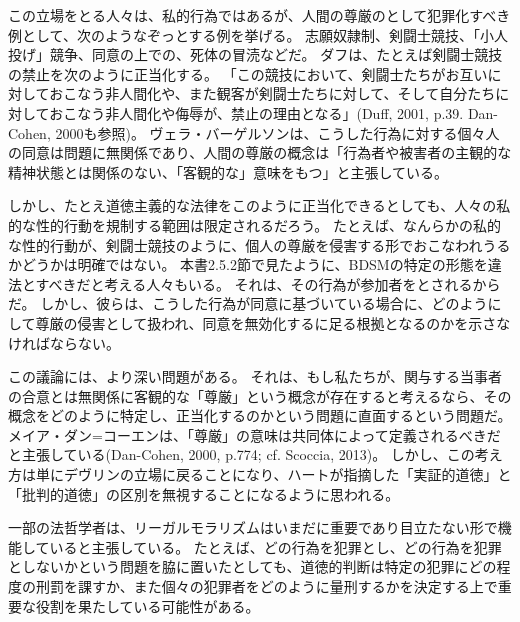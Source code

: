 \documentclass[paper=a4,book,openany]{jlreq}
\newcommand{\ig}[1]{}           %
\begin{document}
この立場をとる人々は、私的行為ではあるが、人間の尊厳のとして犯罪化すべき例として、次のようなぞっとする例を挙げる。
志願奴隷制、剣闘士競技、「小人投げ」競争、同意の上での、死体の冒涜などだ。
ダフは、たとえば剣闘士競技の禁止を次のように正当化する。
「この競技において、剣闘士たちがお互いに対しておこなう非人間化や、また観客が剣闘士たちに対して、そして自分たちに対しておこなう非人間化や侮辱が、禁止の理由となる」(Duff, 2001, p.39. Dan-Cohen, 2000も参照)。
ヴェラ・バーゲルソンは、こうした行為に対する個々人の同意は問題に無関係であり、人間の尊厳の概念は「行為者や被害者の主観的な精神状態とは関係のない、「客観的な」意味をもつ」と主張している\citep[p.217]{bergelson07:_right_be_hurt}。

しかし、たとえ道徳主義的な法律をこのように正当化できるとしても、人々の私的な性的行動を規制する範囲は限定されるだろう。
たとえば、なんらかの私的な性的行動が、剣闘士競技のように、個人の尊厳を侵害する形でおこなわれうるかどうかは明確ではない。
本書2.5.2節で見たように、BDSMの特定の形態を違法とすべきだと考える人々もいる。
それは、その行為が参加者をとされるからだ。
しかし、彼らは、こうした行為が同意に基づいている場合に、どのようにして尊厳の侵害として扱われ、同意を無効化するに足る根拠となるのかを示さなければならない。

この議論には、より深い問題がある。
それは、もし私たちが、関与する当事者の合意とは無関係に客観的な「尊厳」という概念が存在すると考えるなら、その概念をどのように特定し、正当化するのかという問題に直面するという問題だ。
メイア・ダン=コーエンは、「尊厳」の意味は共同体によって定義されるべきだと主張している(Dan-Cohen, 2000, p.774; cf. Scoccia, 2013)。
\nocite{scoccia13:_in_defen_pure_legal_moral}\nocite{dan-cohen00:_basic_values_victim_state_mind}
しかし、この考え方は単にデヴリン\ig{Patrick Devlin}の立場に戻ることになり、ハートが指摘した「実証的道徳」と「批判的道徳」の区別を無視することになるように思われる。

一部の法哲学者は、リーガルモラリズムはいまだに重要であり目立たない形で機能していると主張している。
たとえば、どの行為を犯罪とし、どの行為を犯罪としないかという問題を脇に置いたとしても、道徳的判断は特定の犯罪にどの程度の刑罰を課すか、また個々の犯罪者をどのように量刑するかを決定する上で重要な役割を果たしている可能性がある\citep[cf.][]{ristroph11:_third_wave_legal_moral}。
\end{document}
